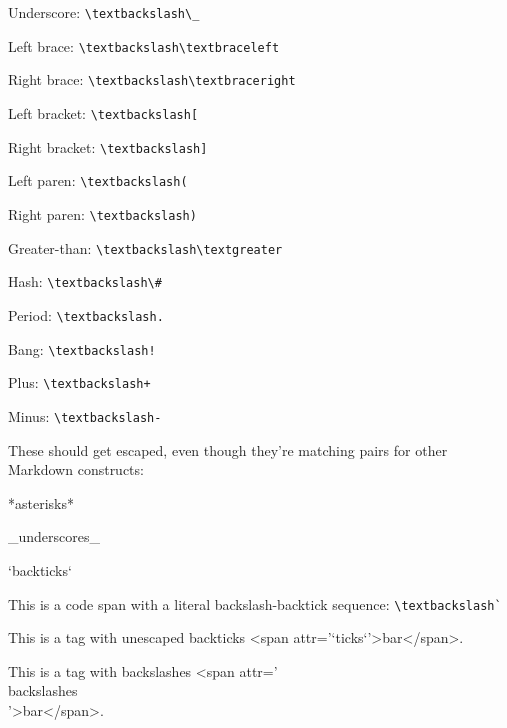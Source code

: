 Underscore: \lstinline{\textbackslash\_}

Left brace: \lstinline{\textbackslash\textbraceleft}

Right brace: \lstinline{\textbackslash\textbraceright}

Left bracket: \lstinline{\textbackslash[}

Right bracket: \lstinline{\textbackslash]}

Left paren: \lstinline{\textbackslash(}

Right paren: \lstinline{\textbackslash)}

Greater-than: \lstinline{\textbackslash\textgreater}

Hash: \lstinline{\textbackslash\#}

Period: \lstinline{\textbackslash.}

Bang: \lstinline{\textbackslash!}

Plus: \lstinline{\textbackslash+}

Minus: \lstinline{\textbackslash-}

These should get escaped, even though they're matching pairs for other Markdown constructs:

*asterisks*

\_underscores\_

`backticks`

This is a code span with a literal backslash-backtick sequence: \lstinline{\textbackslash`}

This is a tag with unescaped backticks <span attr='`ticks`'>bar</span>.

This is a tag with backslashes <span attr='\\backslashes\\'>bar</span>.